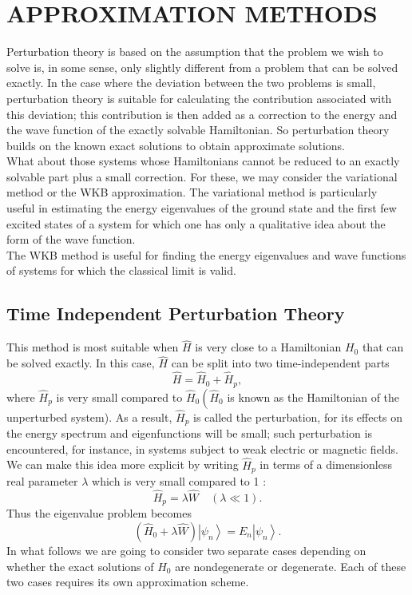 \chapter{APPROXIMATION METHODS}
Perturbation theory is based on the assumption that the problem we wish to solve is, in some sense, only slightly different from a problem that can be solved exactly. In the case where the deviation between the two problems is small, perturbation theory is suitable for calculating the contribution associated with this deviation; this contribution is then added as a correction to the energy and the wave function of the exactly solvable Hamiltonian. So perturbation theory builds on the known exact solutions to obtain approximate solutions.\\
What about those systems whose Hamiltonians cannot be reduced to an exactly solvable part plus a small correction. For these, we may consider the variational method or the WKB approximation. The variational method is particularly useful in estimating the energy eigenvalues of the ground state and the first few excited states of a system for which one has only a qualitative idea about the form of the wave function.\\
The WKB method is useful for finding the energy eigenvalues and wave functions of systems for which the classical limit is valid. 
\section{Time Independent Perturbation Theory}
This method is most suitable when $\hat{H}$ is very close to a Hamiltonian $H_{0}$ that can be solved exactly. In this case, $\hat{H}$ can be split into two time-independent parts
$$
\hat{H}=\hat{H}_{0}+\hat{H}_{p},
$$
where $\hat{H}_{p}$ is very small compared to $\hat{H}_{0}\left(\hat{H}_{0}\right.$ is known as the Hamiltonian of the unperturbed system). As a result, $\hat{H}_{p}$ is called the perturbation, for its effects on the energy spectrum and eigenfunctions will be small; such perturbation is encountered, for instance, in systems subject to weak electric or magnetic fields. We can make this idea more explicit by writing $\hat{H}_{p}$ in terms of a dimensionless real parameter $\lambda$ which is very small compared to 1 :
$$
\hat{H}_{p}=\lambda \hat{W} \quad(\lambda \ll 1) .
$$
Thus the eigenvalue problem becomes
$$
\left(\hat{H}_{0}+\lambda \hat{W}\right)\left|\psi_{n}\right\rangle=E_{n}\left|\psi_{n}\right\rangle .
$$
In what follows we are going to consider two separate cases depending on whether the exact solutions of $\hat{H}_{0}$ are nondegenerate or degenerate. Each of these two cases requires its own approximation scheme.
